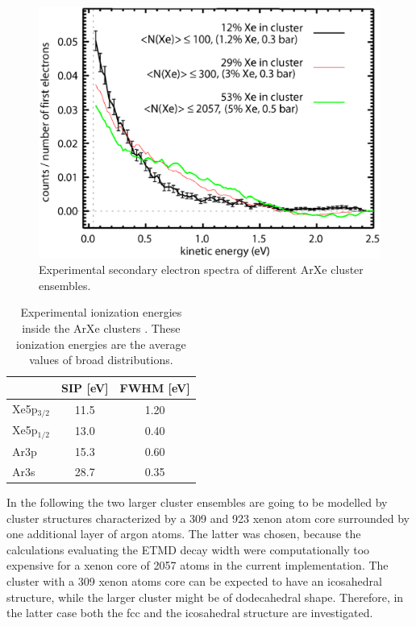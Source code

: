 \begin{figure}
 \centering
 \includegraphics[scale=0.5]{pics/arxe_cluster_exp_groessenvergleich.eps}
 \caption{Experimental secondary electron spectra of different ArXe
          cluster ensembles.}
 \label{figure:arxe_exp}
\end{figure}

\begin{table}
 \centering
 \caption{Experimental ionization energies inside the ArXe clusters
          \cite{Foerstel_private}. These ionization energies are the
          average values of broad distributions.}
 \begin{tabular}{lcc}
  \toprule
             & SIP [eV]  & FWHM [eV] \\
  \midrule
   Xe5p$_{3/2}$ & 11.5   & 1.20 \\
   Xe5p$_{1/2}$ & 13.0   & 0.40 \\
   Ar3p         & 15.3   & 0.60 \\
   Ar3s         & 28.7   & 0.35 \\
  \bottomrule
 \end{tabular}
 \label{table:exp_arxe_ionization}
\end{table}

In the following the two larger cluster ensembles are going to be modelled
by cluster structures characterized by a 309 and 923 xenon atom core surrounded
by one additional layer of argon atoms. The latter was chosen, because the
calculations evaluating the ETMD decay width were computationally
too expensive for a xenon core of 2057 atoms in the current implementation.
The cluster with a 309 xenon atoms core can be expected to have an icosahedral
structure, while the larger cluster might be of dodecahedral shape. Therefore,
in the latter case both the fcc and the icosahedral structure are investigated.

